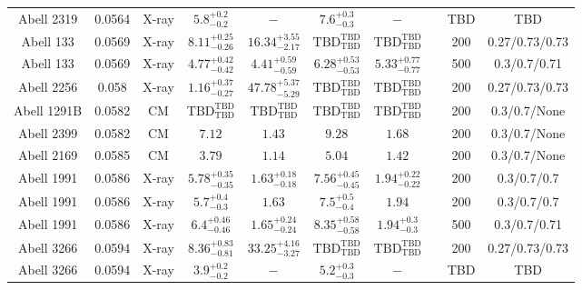 \begin{table}
\begin{tabular}{cccccccccc}
Abell 2319 & 0.0564 & X-ray & ${5.8}^{+0.2}_{-0.2}$ & ${-}^{}_{}$ & ${7.6}^{+0.3}_{-0.3}$ & ${-}^{}_{}$ & \citet{XU01.1} & TBD & TBD \\
Abell 133 & 0.0569 & X-ray & ${8.11}^{+0.25}_{-0.26}$ & ${16.34}^{+3.55}_{-2.17}$ & ${\mathrm{TBD}}^{\mathrm{TBD}}_{\mathrm{TBD}}$ & ${\mathrm{TBD}}^{\mathrm{TBD}}_{\mathrm{TBD}}$ & \citet{BA14.1} & 200 & 0.27/0.73/0.73 \\
Abell 133 & 0.0569 & X-ray & ${4.77}^{+0.42}_{-0.42}$ & ${4.41}^{+0.59}_{-0.59}$ & ${6.28}^{+0.53}_{-0.53}$ & ${5.33}^{+0.77}_{-0.77}$ & \citet{VI05.1} & 500 & 0.3/0.7/0.71 \\
Abell 2256 & 0.058 & X-ray & ${1.16}^{+0.37}_{-0.27}$ & ${47.78}^{+5.37}_{-5.29}$ & ${\mathrm{TBD}}^{\mathrm{TBD}}_{\mathrm{TBD}}$ & ${\mathrm{TBD}}^{\mathrm{TBD}}_{\mathrm{TBD}}$ & \citet{BA14.1} & 200 & 0.27/0.73/0.73 \\
Abell 1291B & 0.0582 & CM & ${\mathrm{TBD}}^{\mathrm{TBD}}_{\mathrm{TBD}}$ & ${\mathrm{TBD}}^{\mathrm{TBD}}_{\mathrm{TBD}}$ & ${\mathrm{TBD}}^{\mathrm{TBD}}_{\mathrm{TBD}}$ & ${\mathrm{TBD}}^{\mathrm{TBD}}_{\mathrm{TBD}}$ & \citet{RI06.1} & 200 & 0.3/0.7/None \\
Abell 2399 & 0.0582 & CM & ${7.12}^{}_{}$ & ${1.43}^{}_{}$ & ${9.28}^{}_{}$ & ${1.68}^{}_{}$ & \citet{RI06.1} & 200 & 0.3/0.7/None \\
Abell 2169 & 0.0585 & CM & ${3.79}^{}_{}$ & ${1.14}^{}_{}$ & ${5.04}^{}_{}$ & ${1.42}^{}_{}$ & \citet{RI06.1} & 200 & 0.3/0.7/None \\
Abell 1991 & 0.0586 & X-ray & ${5.78}^{+0.35}_{-0.35}$ & ${1.63}^{+0.18}_{-0.18}$ & ${7.56}^{+0.45}_{-0.45}$ & ${1.94}^{+0.22}_{-0.22}$ & \citet{PO05.1} & 200 & 0.3/0.7/0.7 \\
Abell 1991 & 0.0586 & X-ray & ${5.7}^{+0.4}_{-0.3}$ & ${1.63}^{}_{}$ & ${7.5}^{+0.5}_{-0.4}$ & ${1.94}^{}_{}$ & \citet{PR05.1} & 200 & 0.3/0.7/0.7 \\
Abell 1991 & 0.0586 & X-ray & ${6.4}^{+0.46}_{-0.46}$ & ${1.65}^{+0.24}_{-0.24}$ & ${8.35}^{+0.58}_{-0.58}$ & ${1.94}^{+0.3}_{-0.3}$ & \citet{VI05.1} & 500 & 0.3/0.7/0.71 \\
Abell 3266 & 0.0594 & X-ray & ${8.36}^{+0.83}_{-0.81}$ & ${33.25}^{+4.16}_{-3.27}$ & ${\mathrm{TBD}}^{\mathrm{TBD}}_{\mathrm{TBD}}$ & ${\mathrm{TBD}}^{\mathrm{TBD}}_{\mathrm{TBD}}$ & \citet{BA14.1} & 200 & 0.27/0.73/0.73 \\
Abell 3266 & 0.0594 & X-ray & ${3.9}^{+0.2}_{-0.2}$ & ${-}^{}_{}$ & ${5.2}^{+0.3}_{-0.3}$ & ${-}^{}_{}$ & \citet{XU01.1} & TBD & TBD \\

\end{tabular}
\end{table}
